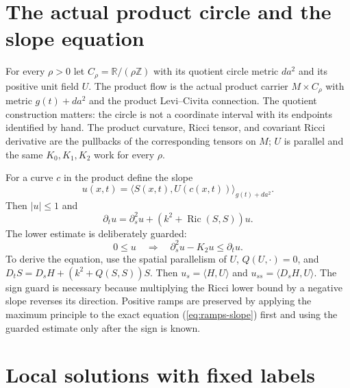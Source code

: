 \section{The actual product circle and the slope equation}
\label{sec:ramps-circle}

For every $\rho>0$ let $C_\rho=\mathbb R/(\rho\mathbb Z)$ with its quotient
circle metric $da^2$ and its positive unit field $U$.  The product flow is the
actual product carrier $M\times C_\rho$ with metric $g(t)+da^2$ and the
product Levi--Civita connection.  The quotient construction matters: the
circle is not a coordinate interval with its endpoints identified by hand.
The product curvature, Ricci tensor, and covariant Ricci derivative are the
pullbacks of the corresponding tensors on $M$; $U$ is parallel and the same
$K_0,K_1,K_2$ work for every $\rho$.

For a curve $c$ in the product define the slope
\[
 u(x,t)=\langle S(x,t),U(c(x,t))\rangle_{g(t)+da^2}.
\]
Then $|u|\leq1$ and
\begin{equation}\label{eq:ramps-slope}
 \partial_tu=\partial_s^2u+(k^2+\operatorname{Ric}(S,S))u.
\end{equation}
The lower estimate is deliberately guarded:
\[
 0\leq u\quad\Longrightarrow\quad
 \partial_s^2u-K_2u\leq\partial_tu.
\]
To derive the equation, use the spatial parallelism of $U$, $Q(U,\cdot)=0$,
and $D_tS=D_sH+(k^2+Q(S,S))S$.
Then $u_s=\langle H,U\rangle$ and
$u_{ss}=\langle D_sH,U\rangle$.
The sign guard is necessary because multiplying the Ricci lower bound by
a negative slope reverses its direction.  Positive ramps are preserved by
applying the maximum principle to the exact equation
(\ref{eq:ramps-slope}) first and using the guarded estimate only after the
sign is known.

\section{Local solutions with fixed labels}
\label{sec:ramps-local-solutions}

